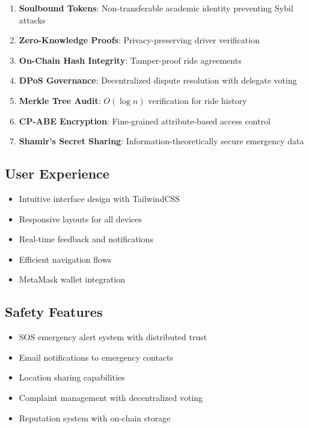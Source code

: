 \begin{enumerate}
    \item \textbf{Soulbound Tokens}: Non-transferable academic identity preventing Sybil attacks
    \item \textbf{Zero-Knowledge Proofs}: Privacy-preserving driver verification
    \item \textbf{On-Chain Hash Integrity}: Tamper-proof ride agreements
    \item \textbf{DPoS Governance}: Decentralized dispute resolution with delegate voting
    \item \textbf{Merkle Tree Audit}: $O(\log n)$ verification for ride history
    \item \textbf{CP-ABE Encryption}: Fine-grained attribute-based access control
    \item \textbf{Shamir's Secret Sharing}: Information-theoretically secure emergency data
\end{enumerate}

\subsection{User Experience}

\begin{itemize}
    \item Intuitive interface design with TailwindCSS
    \item Responsive layouts for all devices
    \item Real-time feedback and notifications
    \item Efficient navigation flows
    \item MetaMask wallet integration
\end{itemize}

\subsection{Safety Features}

\begin{itemize}
    \item SOS emergency alert system with distributed trust
    \item Email notifications to emergency contacts
    \item Location sharing capabilities
    \item Complaint management with decentralized voting
    \item Reputation system with on-chain storage
\end{itemize}

